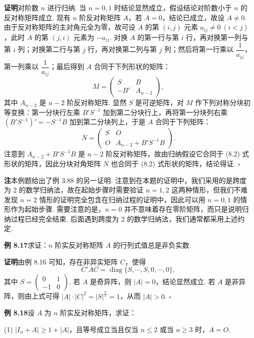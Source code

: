 \documentclass[UTF8,12pt,a4paper,fontset=fandol]{ctexart}
\begin{document}
\noindent\textbf{证明}\quad 对阶数 $n$ 进行归纳. 当 $n=0,1$ 时结论显然成立，假设结论对阶数小于 $n$ 的反对称矩阵成立. 现有 $n$ 阶反对称矩阵 $A$，若 $A=0$，结论已成立，故设 $A\ne 0$. 由于反对称矩阵的主对角元全为零，故可设 $A$ 的第 $(i,j)$ 元素 $a_{ij}\ne 0\ (i<j)$，此时 $A$ 的第 $(j,i)$ 元素为 $-a_{ij}$. 对换 $A$ 的第一行与第 $i$ 行，再对换第一列与第 $i$ 列；对换第二行与第 $j$ 行，再对换第二列与第 $j$ 列；然后将第一行乘以 $\dfrac1{a_{ij}}$，第一列乘以 $\dfrac1{a_{ij}}$；最后得到 $A$ 合同于下列形状的矩阵：
\[
M=\left(\begin{array}{cc}
S & B\\
-B' & A_{n-2}
\end{array}\right),
\]
其中 $A_{n-2}$ 是 $n-2$ 阶反对称矩阵. 显然 $S$ 是可逆矩阵，对 $M$ 作下列对称分块初等变换：第一分块行左乘 $B'S^{-1}$ 加到第二分块行上，再将第一分块列右乘 $(B'S^{-1})'=-S^{-1}B$ 加到第二分块列上，于是 $A$ 合同于下列矩阵：
\[
N=\left(\begin{array}{cc}
S & O\\
O & A_{n-2}+B'S^{-1}B
\end{array}\right).
\]
注意到 $A_{n-2}+B'S^{-1}B$ 是 $n-2$ 阶反对称矩阵，故由归纳假设它合同于 (8.2) 式形状的矩阵，因此分块对角矩阵 $N$ 也合同于 (8.2) 式形状的矩阵，结论得证. $\ensuremath{\square}$

\noindent\textbf{注}\quad 本例题给出了例 3.88 的另一证明. 注意到在本题的证明中，我们采用的是跨度为 2 的数学归纳法，故在起始步骤时需要验证 $n=1,2$ 这两种情形，但我们不难发现 $n=2$ 情形的证明完全包含在归纳过程的证明中，因此可以用 $n=0,1$ 的情形作为起始步骤. 需要注意的是，$n=0$ 并不意味着存在零阶矩阵，而只是说明归纳过程已经完全结束. 后面遇到跨度为 2 的数学归纳法，我们通常都采用上述约定.

\noindent\textbf{例 8.17}\quad 求证：$n$ 阶实反对称矩阵 $A$ 的行列式值总是非负实数.

\noindent\textbf{证明}\quad 由例 8.16 可知，存在非异实矩阵 $C$，使得
\[
C'AC=\operatorname{diag}\{S,\cdots,S,0,\cdots,0\},
\]
其中 $S=\left(\begin{array}{cc}0&1\\ -1&0\end{array}\right)$. 若 $A$ 是奇异阵，则 $|A|=0$，结论显然成立. 若 $A$ 是非异阵，则由上式可得 $|A|\cdot |C|^2=|S|^{\frac n2}=1$，从而 $|A|>0$. $\ensuremath{\square}$

\noindent\textbf{例 8.18}\quad 设 $A$ 为 $n$ 阶实反对称矩阵，求证：

(1) $|I_n+A|\ge 1+|A|$，且等号成立当且仅当 $n\le 2$ 或当 $n\ge 3$ 时，$A=O$.
\end{document}
